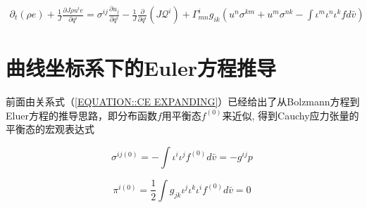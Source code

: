 \documentclass[LBMDerivation.tex]{subfiles}
\begin{document}
\begin{equation}
  \begin{gathered}
    \boxed{
    \partial_{t}\left(\rho e\right) + \frac{1}{J}\frac{\partial J \rho u^i e}{\partial  q^{i}}     =  \sigma^{ij}  \frac{\partial  u_j}{\partial q^{i}} - \frac{1}{J}\frac{\partial}{\partial q^{i}} (J \mathcal{Q}^i) + \Gamma^i_{mn}  g_{ik} ( u^n \sigma^{km}+u^m \sigma^{nk} -  \int \iota^m \iota^n  \iota^{k} f  d \bar{v})
    }
  \end{gathered}
  \label{动量方程输运形式4} ~
\end{equation}






\section{曲线坐标系下的Euler方程推导}




前面由关系式（\ref{EQUATION::CE EXPANDING}）已经给出了从Bolzmann方程到Eluer方程的推导思路，即分布函数$f$用平衡态$f^{(0)}$来近似, 得到Cauchy应力张量的平衡态的宏观表达式

\begin{equation}
  \sigma^{ij(0)} =-\int \iota^{i} \iota^{j} f^{(0)}  d \bar{v}= -g^{ij} p
  \label{EQUATION::Cauchy应力张量1} ~
\end{equation}


\begin{equation}
  \pi^{i (0)} =\frac{1}{2}\int g_{jk} \iota^{j} \iota^{k}  \iota^{i} f^{(0)}  d \bar{v}= 0
  \label{EQUATION::heat flux} ~
\end{equation}





%
%




%
%
%
%

%
%
\end{document}
